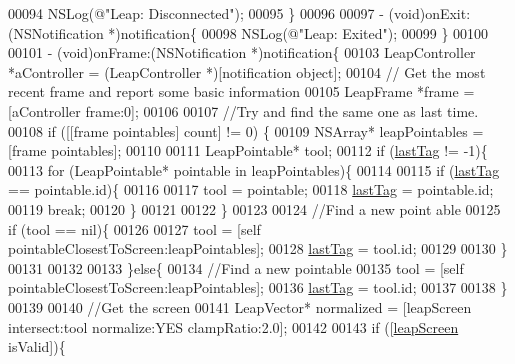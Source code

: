 \begin{DoxyCode}
{{00094     NSLog(\textcolor{stringliteral}{@"Leap: Disconnected"});
00095 \}
00096 
00097 - (void)onExit:(NSNotification *)notification\{
00098     NSLog(\textcolor{stringliteral}{@"Leap: Exited"});
00099 \}
00100 
00101 - (void)onFrame:(NSNotification *)notification\{
00103     LeapController *aController = (LeapController *)[notification \textcolor{keywordtype}{object}];
00104     \textcolor{comment}{// Get the most recent frame and report some basic information}
00105     LeapFrame *frame = [aController frame:0];
00106     
00107     \textcolor{comment}{//Try and find the same one as last time.}
00108     \textcolor{keywordflow}{if} ([[frame pointables] count] != 0) \{
00109         NSArray* leapPointables = [frame pointables];
00110         
00111         LeapPointable* tool;
00112         \textcolor{keywordflow}{if} (\hyperlink{interface_game_manager_a0b83b09829718f85c17d64f6ee06d441}{lastTag} != -1)\{
00113             \textcolor{keywordflow}{for} (LeapPointable* pointable in leapPointables)\{
00114                 
00115                 \textcolor{keywordflow}{if} (\hyperlink{interface_game_manager_a0b83b09829718f85c17d64f6ee06d441}{lastTag} == pointable.id)\{
00116                     
00117                     tool = pointable;
00118                     \hyperlink{interface_game_manager_a0b83b09829718f85c17d64f6ee06d441}{lastTag} = pointable.id;
00119                     \textcolor{keywordflow}{break};
00120                 \}
00121                 
00122             \}
00123             
00124             \textcolor{comment}{//Find a new point able}
00125             \textcolor{keywordflow}{if} (tool == nil)\{
00126                 
00127                 tool = [\textcolor{keyword}{self} pointableClosestToScreen:leapPointables];
00128                 \hyperlink{interface_game_manager_a0b83b09829718f85c17d64f6ee06d441}{lastTag} = tool.id;
00129                 
00130             \}
00131             
00132     
00133         \}\textcolor{keywordflow}{else}\{
00134             \textcolor{comment}{//Find a new pointable}
00135             tool = [\textcolor{keyword}{self} pointableClosestToScreen:leapPointables];
00136             \hyperlink{interface_game_manager_a0b83b09829718f85c17d64f6ee06d441}{lastTag} = tool.id;
00137             
00138         \}
00139         
00140         \textcolor{comment}{//Get the screen}
00141         LeapVector* normalized = [leapScreen intersect:tool normalize:YES clampRatio:2.0];
00142         
00143         \textcolor{keywordflow}{if} ([\hyperlink{interface_game_manager_a85cb30e21c987f66855a762c6ba88096}{leapScreen} isValid])\{
}}
\end{DoxyCode}
